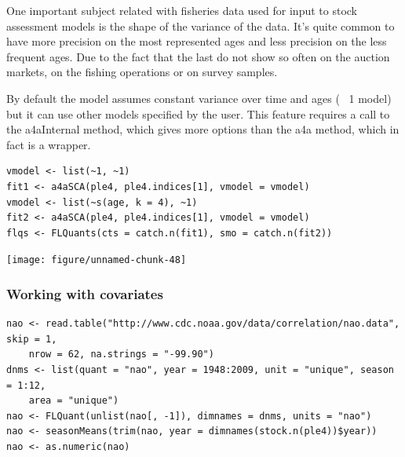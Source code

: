\documentclass[a4paper,english,10pt]{article}\usepackage[]{graphicx}\usepackage[]{color}
\makeatletter
\newenvironment{kframe}{%
 \def\at@end@of@kframe{}%
 \ifinner\ifhmode%
  \def\at@end@of@kframe{\end{minipage}}%
  \begin{minipage}{\columnwidth}%
 \fi\fi%
 \def\FrameCommand##1{\hskip\@totalleftmargin \hskip-\fboxsep
 \colorbox{shadecolor}{##1}\hskip-\fboxsep
     \hskip-\linewidth \hskip-\@totalleftmargin \hskip\columnwidth}%
 \MakeFramed {\advance\hsize-\width
   \@totalleftmargin\z@ \linewidth\hsize
   \@setminipage}}%
 {\par\unskip\endMakeFramed%
 \at@end@of@kframe}
\newenvironment{knitrout}{}{} %
\makeatother
\begin{document}
One important subject related with fisheries data used for input to stock assessment models is the shape of the variance of the data. It's quite common to have more precision on the most represented ages and less precision on the less frequent ages. Due to the fact that the last do not show so often on the auction markets, on the fishing operations or on survey samples.

By default the model assumes constant variance over time and ages (~ 1 model) but it can use other models specified by the user. This feature requires a call to the a4aInternal method, which gives more options than the a4a method, which in fact is a wrapper.

\begin{knitrout}
\color{fgcolor}\begin{kframe}
\begin{verbatim}
vmodel <- list(~1, ~1)
fit1 <- a4aSCA(ple4, ple4.indices[1], vmodel = vmodel)
vmodel <- list(~s(age, k = 4), ~1)
fit2 <- a4aSCA(ple4, ple4.indices[1], vmodel = vmodel)
flqs <- FLQuants(cts = catch.n(fit1), smo = catch.n(fit2))
\end{verbatim}
\end{kframe}
\end{knitrout}


\begin{knitrout}
\color{fgcolor}

{\centering \texttt{[image: figure/unnamed-chunk-48]} 

}



\end{knitrout}


\subsubsection{Working with covariates}

\begin{knitrout}
\color{fgcolor}\begin{kframe}
\begin{verbatim}
nao <- read.table("http://www.cdc.noaa.gov/data/correlation/nao.data", skip = 1, 
    nrow = 62, na.strings = "-99.90")
dnms <- list(quant = "nao", year = 1948:2009, unit = "unique", season = 1:12, 
    area = "unique")
nao <- FLQuant(unlist(nao[, -1]), dimnames = dnms, units = "nao")
nao <- seasonMeans(trim(nao, year = dimnames(stock.n(ple4))$year))
nao <- as.numeric(nao)
\end{verbatim}
\end{kframe}
\end{knitrout}
\end{document}
